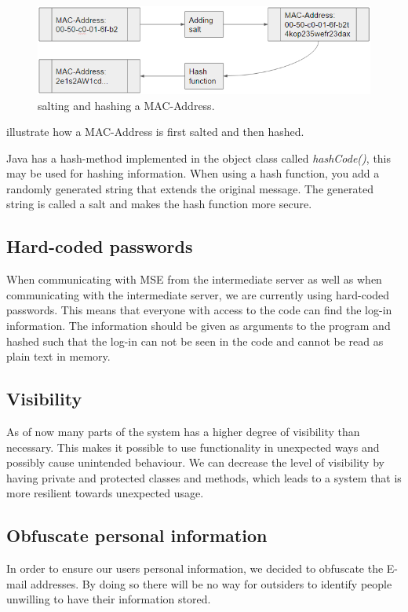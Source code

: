 \begin{figure}[ht]
	\begin{center}
		\includegraphics[scale=0.9]{graphics/salt.png}
		\caption{salting and hashing a MAC-Address.}
		\label{fig:salt}
	\end{center} 
\end{figure}

 illustrate how a MAC-Address is first salted and then hashed.

Java has a hash-method implemented in the object class called \textit{hashCode()}, this may be used for hashing information. When using a hash function, you add a randomly generated string that extends the original message. The generated string is called a salt and makes the hash function more secure.

\subsection*{Hard-coded passwords}
When communicating with MSE from the intermediate server as well as when communicating with the intermediate server, we are currently using hard-coded passwords. This means that everyone with access to the code can find the log-in information. The information should be given as arguments to the program and hashed such that the log-in can not be seen in the code and cannot be read as plain text in memory. 

\subsection*{Visibility}
As of now many parts of the system has a higher degree of visibility than necessary. This makes it possible to use functionality in unexpected ways and possibly cause unintended behaviour. We can decrease the level of visibility by having private and protected classes and methods, which leads to a system that is more resilient towards unexpected usage.
 
\subsection*{Obfuscate personal information}
In order to ensure our users personal information, we decided to obfuscate the E-mail addresses. By doing so there will be no way for outsiders to identify people unwilling to have their information stored.

